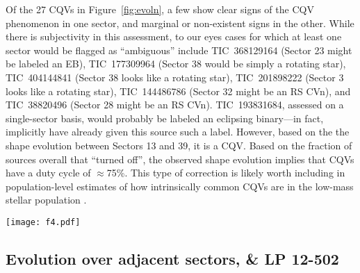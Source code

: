 \documentclass[11pt,twocolumn,tighten]{aastex63}
\begin{document}
Of the 27 CQVs in Figure~\ref{fig:evoln}, a few show clear signs of
the CQV phenomenon in one sector, and marginal or non-existent signs
in the other.  While there is subjectivity in this assessment, to our
eyes cases for which at least one sector would be flagged as
``ambiguous'' include
TIC~368129164 (Sector 23 might be labeled an EB),
TIC~177309964 (Sector 38 would be simply a rotating star),
TIC~404144841 (Sector 38 looks like a rotating star),
TIC~201898222 (Sector 3 looks like a rotating star),
TIC~144486786 (Sector 32 might be an RS CVn),
and
TIC~38820496 (Sector 28 might be an RS CVn).
TIC~193831684, assessed on a single-sector basis, would probably be
labeled an eclipsing binary---in fact, \citet{2021ApJ...912..123J}
implicitly have already given this source such a label.  However,
based on the the shape evolution between Sectors 13 and 39, it is a
CQV.  Based on the fraction of sources overall that ``turned off'',
the observed shape evolution implies that CQVs have a duty cycle of
$\approx$75\%.  This type of correction is likely worth including in
population-level estimates of how intrinsically common CQVs are in the
low-mass stellar population \citep[e.g.][]{2022AJ....163..144G}.


\begin{figure*}[!tp]
	\begin{center}
		\centering
		\texttt{[image: f4.pdf]}
		\vspace{-0.6cm}
		\caption{
		{\bf CQVs keep their periods but change their shapes.}
      Out of the \ngoods\ CQVs in Figure~\ref{fig:cqvs}, 32 had
      120-second cadence TESS data available for a baseline of at
      least two years; the 27 brightest are shown here due to space
      constraints.  Each panel shows one sector of TESS data, and is
      phased to its deepest minimum in flux.  Each panel's title shows
      the TIC identifier and approximate period in hours.  Text insets
      show the TESS sector numbers, which generally span two years, or
      at least 1{,}000 cycles.  The vertical scale is fixed across
      sectors to clarify shape changes.  Gray circles are raw 2-minute
      data; colored circles bin to 300 points per cycle. 
		}
		\label{fig:evoln}
	\end{center}
\end{figure*}


\subsection{Evolution over adjacent sectors, \& LP 12-502}
\end{document}
